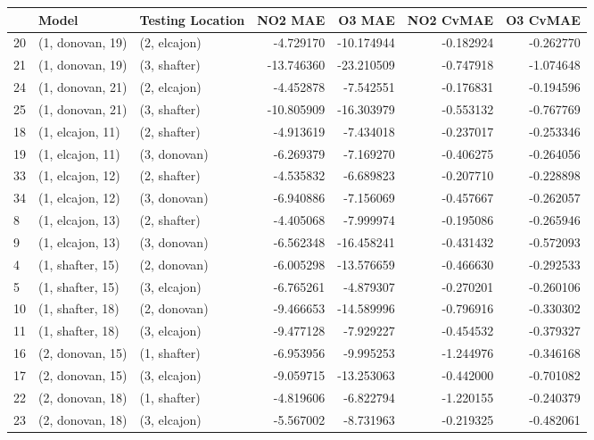 \begin{tabular}{lllrrrr}
\toprule
{} &             Model & Testing Location &    NO2 MAE &     O3 MAE &  NO2 CvMAE &  O3 CvMAE \\
\midrule
20 &  (1, donovan, 19) &     (2, elcajon) &  -4.729170 & -10.174944 &  -0.182924 & -0.262770 \\
21 &  (1, donovan, 19) &     (3, shafter) & -13.746360 & -23.210509 &  -0.747918 & -1.074648 \\
24 &  (1, donovan, 21) &     (2, elcajon) &  -4.452878 &  -7.542551 &  -0.176831 & -0.194596 \\
25 &  (1, donovan, 21) &     (3, shafter) & -10.805909 & -16.303979 &  -0.553132 & -0.767769 \\
18 &  (1, elcajon, 11) &     (2, shafter) &  -4.913619 &  -7.434018 &  -0.237017 & -0.253346 \\
19 &  (1, elcajon, 11) &     (3, donovan) &  -6.269379 &  -7.169270 &  -0.406275 & -0.264056 \\
33 &  (1, elcajon, 12) &     (2, shafter) &  -4.535832 &  -6.689823 &  -0.207710 & -0.228898 \\
34 &  (1, elcajon, 12) &     (3, donovan) &  -6.940886 &  -7.156069 &  -0.457667 & -0.262057 \\
8  &  (1, elcajon, 13) &     (2, shafter) &  -4.405068 &  -7.999974 &  -0.195086 & -0.265946 \\
9  &  (1, elcajon, 13) &     (3, donovan) &  -6.562348 & -16.458241 &  -0.431432 & -0.572093 \\
4  &  (1, shafter, 15) &     (2, donovan) &  -6.005298 & -13.576659 &  -0.466630 & -0.292533 \\
5  &  (1, shafter, 15) &     (3, elcajon) &  -6.765261 &  -4.879307 &  -0.270201 & -0.260106 \\
10 &  (1, shafter, 18) &     (2, donovan) &  -9.466653 & -14.589996 &  -0.796916 & -0.330302 \\
11 &  (1, shafter, 18) &     (3, elcajon) &  -9.477128 &  -7.929227 &  -0.454532 & -0.379327 \\
16 &  (2, donovan, 15) &     (1, shafter) &  -6.953956 &  -9.995253 &  -1.244976 & -0.346168 \\
17 &  (2, donovan, 15) &     (3, elcajon) &  -9.059715 & -13.253063 &  -0.442000 & -0.701082 \\
22 &  (2, donovan, 18) &     (1, shafter) &  -4.819606 &  -6.822794 &  -1.220155 & -0.240379 \\
23 &  (2, donovan, 18) &     (3, elcajon) &  -5.567002 &  -8.731963 &  -0.219325 & -0.482061 \\

\end{tabular}
